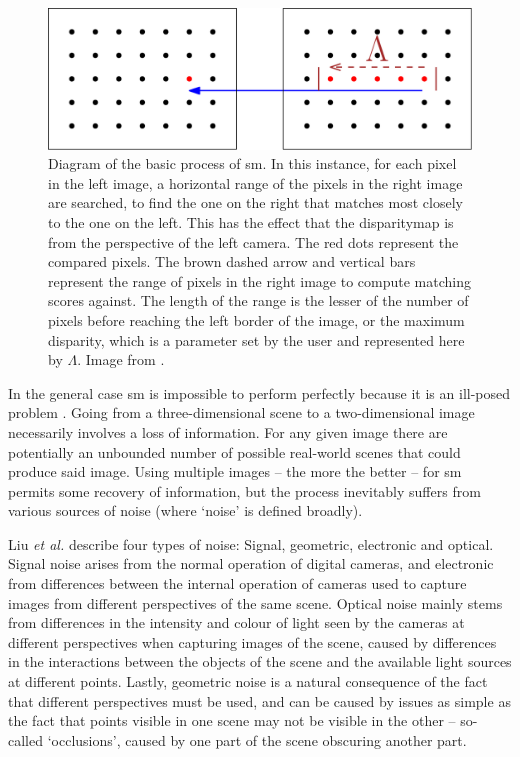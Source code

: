 \begin{figure}
    \centering
    \includegraphics[width=1.0\textwidth]{chapters/litreview/images/stereo_matching-eps-converted-to.pdf}
    \caption[Diagram of the basic process of \gls{sm}]{Diagram of the basic process of \gls{sm}. In this instance, for each pixel in the left image, a horizontal range of the pixels in the right image are searched, to find the one on the right that matches most closely to the one on the left. This has the effect that the \gls{disparitymap} is from the perspective of the left camera. The red dots represent the compared pixels. The brown dashed arrow and vertical bars represent the range of pixels in the right image to compute matching scores against. The length of the range is the lesser of the number of pixels before reaching the left border of the image, or the maximum \gls{disparity}, which is a parameter set by the user and represented here by \(\Lambda\).  Image from \cite{bsmpcvpic}.}
    \label{fig:stereomatchingbasic}
\end{figure}

In the general case \gls{sm} is impossible to perform perfectly because it is an ill-posed problem \cite{Gimelfarb1998}.  Going from a three-dimensional scene to a two-dimensional image necessarily involves a loss of information.  For any given image there are potentially an unbounded number of possible real-world scenes that could produce said image.  Using multiple images -- the more the better -- for \gls{sm} permits some recovery of information, but the process inevitably suffers from various sources of noise (where `noise' is defined broadly).

Liu \textit{et al.} \cite{Liu2005} describe four types of noise:  Signal, geometric, electronic and optical.  Signal noise arises from the normal operation of digital cameras, and electronic from differences between the internal operation of cameras used to capture images from different perspectives of the same scene.  Optical noise mainly stems from differences in the intensity and colour of light seen by the cameras at different perspectives when capturing images of the scene, caused by differences in the interactions between the objects of the scene and the available light sources at different points.  Lastly, geometric noise is a natural consequence of the fact that different perspectives must be used, and can be caused by issues as simple as the fact that points visible in one scene may not be visible in the other -- so-called `occlusions', caused by one part of the scene obscuring another part.

